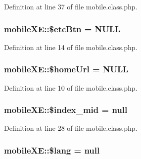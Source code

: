 Definition at line 37 of file mobile.\+class.\+php.

\subsubsection[{\texorpdfstring{\$etc\+Btn}{$etcBtn}}]{\setlength{\rightskip}{0pt plus 5cm}mobile\+X\+E\+::\$etc\+Btn = N\+U\+LL}\hypertarget{classmobileXE_adac4ec3b5f46d10ac063ccba83f8ffa7}{}\label{classmobileXE_adac4ec3b5f46d10ac063ccba83f8ffa7}


Definition at line 14 of file mobile.\+class.\+php.

\subsubsection[{\texorpdfstring{\$home\+Url}{$homeUrl}}]{\setlength{\rightskip}{0pt plus 5cm}mobile\+X\+E\+::\$home\+Url = N\+U\+LL}\hypertarget{classmobileXE_abff078bb36c02394447e55be4500b762}{}\label{classmobileXE_abff078bb36c02394447e55be4500b762}


Definition at line 10 of file mobile.\+class.\+php.

\subsubsection[{\texorpdfstring{\$index\+\_\+mid}{$index_mid}}]{\setlength{\rightskip}{0pt plus 5cm}mobile\+X\+E\+::\$index\+\_\+mid = {\bf null}}\hypertarget{classmobileXE_a9e93ed38eed50085338e8128ab4015ab}{}\label{classmobileXE_a9e93ed38eed50085338e8128ab4015ab}


Definition at line 28 of file mobile.\+class.\+php.

\subsubsection[{\texorpdfstring{\$lang}{$lang}}]{\setlength{\rightskip}{0pt plus 5cm}mobile\+X\+E\+::\$lang = {\bf null}}\hypertarget{classmobileXE_a126d781fe75edb57ef2718f5a6e26d82}{}\label{classmobileXE_a126d781fe75edb57ef2718f5a6e26d82}


